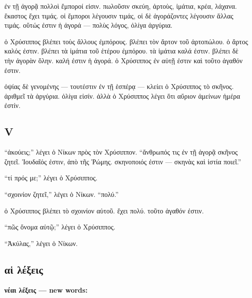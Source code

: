 \documentclass[a4paper]{report}
\begin{document}
ἐν τῇ ἀγορᾷ πολλοὶ ἔμποροί εἰσιν. πωλοῦσιν σκεύη, ἀρτοὺς, ἱμάτια, κρέα,
λάχανα. ἕκαστος ἔχει τιμάς. οἱ ἔμποροι λέγουσιν τιμάς, οἱ δὲ ἀγοράζοντες
λέγουσιν ἄλλας τιμάς. οὕτώς ἐστιν ἡ ἀγορά --- πολὺς λόγος, ὀλίγα
ἀργύρια.

ὁ Χρύσιππος βλέπει τοὺς ἄλλους ἐμπόρους. βλέπει τὸν ἄρτον τοῦ ἀρτοπώλου.
ὁ ἄρτος καλός ἐστιν. βλέπει τὰ ἱμάτια τοῦ ἑτέρου ἐμπόρου. τὰ ἱμάτια καλά
ἐστιν. βλέπει δὲ τὴν ἀγορὰν ὅλην. καλή ἐστιν ἡ ἀγορά. ὁ Χρύσιππος ἐν
αὐτῇ ἐστιν καὶ τοῦτο ἀγαθόν ἐστιν.

ὀψίας δὲ γενομένης --- τουτέστιν ἐν τῇ ἑσπέρᾳ --- κλείει ὁ Χρύσιππος τὸ
σκῆνος. ἀριθμεῖ τὰ ἀργύρια. ὀλίγα εἰσίν. ἀλλὰ ὁ Χρύσιππος λέγει ὅτι
αὔριον ἀμείνων ἡμέρα ἐστίν.

\subsection{V}\label{v-1}

``ἀκούεις;'' λέγει ὁ Νίκων πρὸς τὸν Χρύσιππον. ``ἄνθρωπός τις ἐν τῇ
ἀγορᾷ σκῆνος ζητεῖ. Ἰουδαῖός ἐστιν, ἀπὸ τῆς Ῥώμης. σκηνοποιός ἐστιν ---
σκηνὰς καὶ ἱστία ποιεῖ.''

``τί πρός με;'' λέγει ὁ Χρύσιππος.

``σχοινίον ζητεῖ,'' λέγει ὁ Νίκων. ``πολύ.''

ὁ Χρύσιππος βλέπει τὸ σχοινίον αὑτοῦ. ἔχει πολύ. τοῦτο ἀγαθόν ἐστιν.

``πῶς ὄνομα αὐτῷ;'' λέγει ὁ Χρύσιππος.

``Ἀκύλας,'' λέγει ὁ Νίκων.

\subsection{αἱ λέξεις}\label{ux3b1ux1f31-ux3bbux3adux3beux3b5ux3b9ux3c2}

\textbf{νέαι λέξεις --- new words:}
\end{document}
